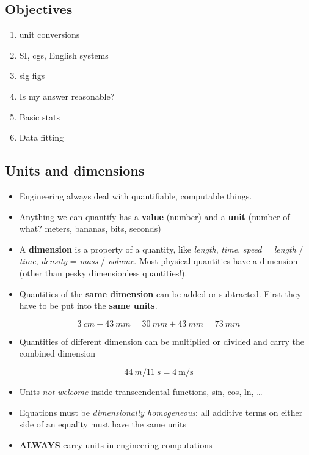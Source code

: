 \documentclass[11pt]{article}
\begin{document}
\subsection{Objectives}
\label{sec-3-1}
\begin{enumerate}
\item unit conversions
\item SI, cgs, English systems
\item sig figs
\item Is my answer reasonable?
\item Basic stats
\item Data fitting
\end{enumerate}
\subsection{Units and dimensions}
\label{sec-3-2}
\begin{itemize}
\item Engineering always deal with quantifiable, computable things.
\item Anything we can quantify has a \textbf{value} (number) and a \textbf{unit} (number of what? meters, bananas, bits, seconds)
\item A \textbf{dimension} is a property of a quantity, like \emph{length}, \emph{time}, \emph{speed} = \emph{length} / \emph{time}, \emph{density} = \emph{mass} / \emph{volume}.  Most physical quantities have a dimension (other than pesky dimensionless quantities!).
\item Quantities of the \textbf{same dimension} can be added or subtracted.  First they have to be put into the \textbf{same units}.
\end{itemize}

\[\boxed{\SI{3}{cm}+\SI{43}{mm} = \SI{30}{mm} + \SI{43}{mm} = \SI{73}{mm}} \]

\begin{itemize}
\item Quantities of different dimension can be multiplied or divided and carry the combined dimension
\end{itemize}
\[\boxed{ \SI{44}{m} / \SI{11}{s} = \SI[per-mode=symbol]{4}{\m\per\s}} \]

\begin{itemize}
\item Units \emph{not welcome} inside transcendental functions, sin, cos, ln, \ldots

\item Equations must be \emph{dimensionally homogeneous}: all additive terms on either side of an equality must have the same units

\item \textbf{ALWAYS} carry units in engineering computations
\end{itemize}
\end{document}
